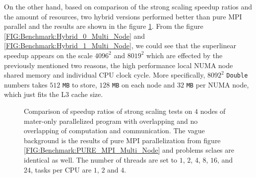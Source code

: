 On the other hand, 
based on comparison of the strong scaling speedup ratios and the amount of resources,
two hybrid versions performed better than pure MPI parallel and the 
results are shown in the figure \ref{FIG:Benchmark:Hybrid_Multi_Node}.
From the figure \ref{FIG:Benchmark:Hybrid_0_Multi_Node} and \ref{FIG:Benchmark:Hybrid_1_Multi_Node},
we could see that the superlinear speedup appears on the scale $4096^2$ and $8019^2$ which are effected by 
the previously mentioned two reasons, the high performance local NUMA node shared memory and individual CPU clock cycle.
More specifically, $8092^2$ \texttt{Double} numbers takes $512$ \texttt{MB} to store, $128$ \texttt{MB} on each node and $32$ \texttt{MB} per NUMA node,
which just fits the L3 cache size.

\begin{figure}[htbp]
  \centering
  \hfill
  \caption{
    Comparison of speedup ratios of strong scaling tests on $4$ nodes of 
    mater-only parallelized program with overlapping and no overlapping of computation and communication.  
    The vague background is the results of pure MPI parallelization from figure 
    \ref{FIG:Benchmark:PURE_MPI_Multi_Node} and problems sclaes are identical as well.
    The number of threads are set to $1$, $2$, $4$, $8$, $16$, and $24$, 
    tasks per CPU are $1$, $2$ and $4$.
  }
  \label{FIG:Benchmark:Hybrid_Multi_Node}
\end{figure}

